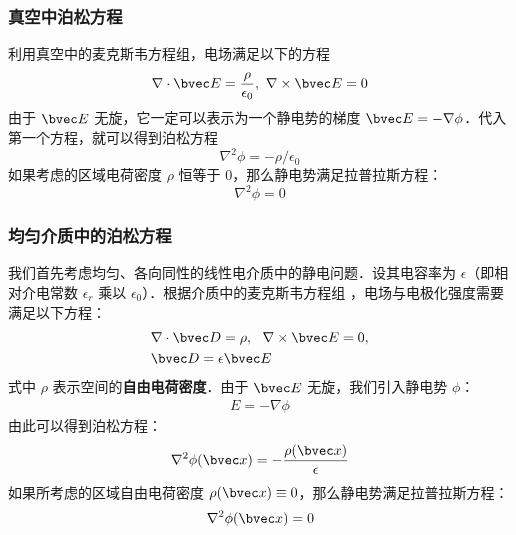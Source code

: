 \subsubsection{真空中泊松方程}
利用真空中的麦克斯韦方程组，电场满足以下的方程
\begin{equation}
\nabla\cdot \bvec E=\frac{\rho}{\epsilon_0},\  \nabla\times \bvec E=0
\end{equation}
由于 $\bvec E$ 无旋，它一定可以表示为一个静电势的梯度 $\bvec E=-\nabla \phi$．代入第一个方程，就可以得到泊松方程
\begin{equation}
\nabla^2\phi=-\rho/\epsilon_0
\end{equation}
如果考虑的区域电荷密度 $\rho$ 恒等于 $0$，那么静电势满足拉普拉斯方程：
\begin{equation}
\nabla^2\phi=0
\end{equation}

\subsubsection{均匀介质中的泊松方程}
我们首先考虑均匀、各向同性的线性电介质中的静电问题．设其电容率为 $\epsilon$（即相对介电常数 $\epsilon_r$ 乘以 $\epsilon_0$）．根据介质中的麦克斯韦方程组 ，电场与电极化强度需要满足以下方程：
\begin{align}
&\nabla \cdot \bvec D = \rho,\ \ \nabla \times \bvec E = 0,\\
&\bvec D=\epsilon \bvec E
\end{align}
式中 $\rho$ 表示空间的\textbf{自由电荷密度}．由于 $\bvec E$ 无旋，我们引入静电势 $\phi$：
\begin{align}
E=-\nabla \phi
\end{align}
由此可以得到泊松方程：
\begin{align}
\nabla^2 \phi(\bvec x)=-\frac{\rho(\bvec x)}{\epsilon} \label{EPoiEQ_eq1}
\end{align}
如果所考虑的区域自由电荷密度 $\rho(\bvec x)\equiv 0$，那么静电势满足拉普拉斯方程：
\begin{align}
\nabla^2 \phi(\bvec x)=0
\end{align}

